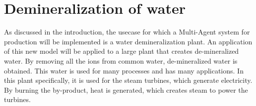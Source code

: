 %		
%	



\section{Demineralization of water}
As discussed in the introduction, the usecase for which a Multi-Agent system for production will be implemented is a water demineralization plant. An application of this new model will be applied to a large plant that creates de-mineralized water. By removing all the ions from common water, de-mineralized water is obtained. This water is used for many processes and has many applications. In this plant specifically, it is used for the steam turbines, which generate electricity. By burning the by-product, heat is generated, which creates steam to power the turbines. 

